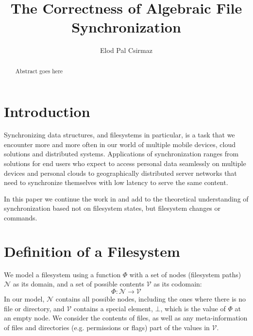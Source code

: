 \documentclass[12pt]{article}
\title{The Correctness of Algebraic File Synchronization}
\author{Elod Pal Csirmaz}
\newcommand{\setv}{\mathcal{V}} %
\newcommand{\setn}{\mathcal{N}} %
\newcommand{\empt}{\bot}
\newcommand{\FS}{\Phi} %
\theoremstyle{definition}
\begin{document}
\maketitle
\begin{abstract}
Abstract goes here
\end{abstract}

\section{Introduction}

Synchronizing data structures, and filesystems in particular,
is a task that we encounter more and more often in our world
of multiple mobile devices, cloud solutions and distributed systems.
Applications of synchronization ranges from
solutions for end users who expect to access personal data seamlessly
on multiple devices and personal clouds to geographically distributed server networks
that need to synchronize themselves with low latency to serve the 
same content.

In this paper we
continue the work in \cite{NREC:alg} and add to the theoretical understanding
of synchronization based not on filesystem states, but filesystem changes or commands.





\section{Definition of a Filesystem}

We model a filesystem using a function $\FS$ with a set of nodes (filesystem paths) $\setn$ as its domain,
and a set of possible contents $\setv$ as its codomain:
\[ \FS : \setn \rightarrow \setv \] 
In our model, $\setn$ contains all possible nodes, including the ones where there is no file or directory,
and $\setv$ contains a special element, $\empt$, which is the value of $\FS$ at an empty node.
We consider the contents of files, as well as any meta-information of files
and directories (e.g. permissions or flags) part of the values in $\setv$.
\end{document}
